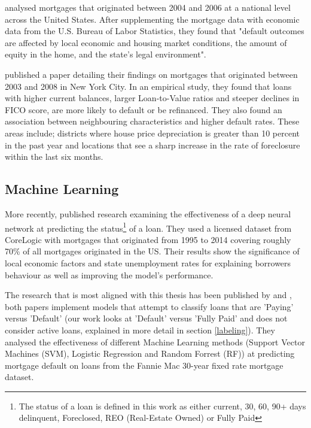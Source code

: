             \cite{default_risk_2012} analysed mortgages that originated between 2004 and 2006 at a national level across the United States. After supplementing the mortgage data with economic data from the U.S. Bureau of Labor Statistics, they found that "default outcomes are affected by local economic and housing market conditions, the amount of equity in the home, and the state’s legal environment". 
            
            \cite{default_risk_2011} published a paper detailing their findings on mortgages that originated between 2003 and 2008 in New York City. In an empirical study, they found that loans with higher current balances, larger Loan-to-Value ratios and steeper declines in FICO score, are more likely to default or be refinanced. They also found an association between neighbouring characteristics and higher default rates. These areas include; districts where house price depreciation is greater than 10 percent in the past year and locations that see a sharp increase in the rate of foreclosure within the last six months.
            

            
        
        \subsection{Machine Learning}

            More recently, \cite{mortgage_risk} published research examining the effectiveness of a deep neural network at predicting the status\footnote{The status of a loan is defined in this work as either current, 30, 60, 90+ days delinquent, Foreclosed, REO (Real-Estate Owned) or Fully Paid} of a loan. They used a licensed dataset from CoreLogic with mortgages that originated from 1995 to 2014 covering roughly 70\% of all mortgages originated in the US. Their results show the significance of local economic factors and state unemployment rates for explaining borrowers behaviour as well as improving the model's performance. 
            
            The research that is most aligned with this thesis has been published by \cite{similar_paper_bagherpour} and \cite{similar_paper_deng}, both papers implement models that attempt to classify loans that are 'Paying' versus 'Default' (our work looks at 'Default' versus 'Fully Paid' and does not consider active loans, explained in more detail in section \ref{labeling}). They analysed the effectiveness of different Machine Learning methods (Support Vector Machines (SVM), Logistic Regression and Random Forrest (RF)) at predicting mortgage default on loans from the Fannie Mac 30-year fixed rate mortgage dataset.
            
